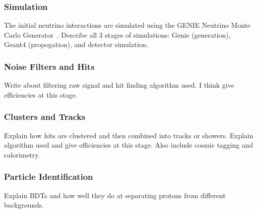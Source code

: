   \subsubsection{Simulation}
    The initial neutrino interactions are simulated using the GENIE Neutrino
    Monte Carlo Generator~\cite{Andreopoulos:2009rq,Andreopoulos:2015wxa}.
    Describe all 3 stages of simulations: Genie (generation), Geant4
    (propogation), and detector simulation.
  \subsubsection{Noise Filters and Hits}
    Write about filtering raw signal and hit finding algorithm used.
    I think give efficiencies at this stage.
  \subsubsection{Clusters and Tracks}
    Explain how hits are clustered and then combined into tracks or showers.
    Explain algorithm used and give efficiencies at this stage. Also include
    cosmic tagging and calorimetry.
  \subsubsection{Particle Identification}
    Explain BDTs and how well they do at separating protons from
    different backgrounds.

